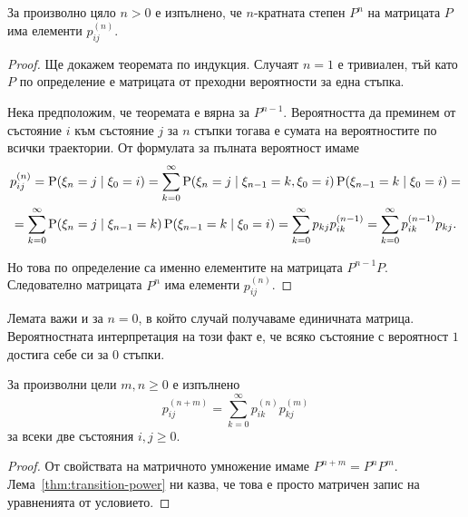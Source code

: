 \documentclass[numbers=endperiod, DIV=15, bibliography=totocnumbered]{scrartcl}
\begin{document}
\begin{lemma}\label{thm:transition-power}
  За произволно цяло $n > 0$ е изпълнено, че $n$-кратната степен $P^n$ на матрицата $P$ има елементи $p_{ij}^{(n)}$.
\end{lemma}
\begin{proof}
  Ще докажем теоремата по индукция. Случаят $n = 1$ е тривиален, тъй като $P$ по определение е матрицата от преходни вероятности за една стъпка.

  Нека предположим, че теоремата е вярна за $P^{n-1}$. Вероятността да преминем от състояние $i$ към състояние $j$ за $n$ стъпки тогава е сумата на вероятностите по всички траектории. От формулата за пълната вероятност имаме
  \begin{multline*}
    p^{(n)}_{ij}
    =
    \operatorname{P}(\xi_n = j \mid \xi_0 = i)
    =
    \sum_{k=0}^\infty \operatorname{P}(\xi_n = j \mid \xi_{n-1} = k, \xi_0 = i) \operatorname{P}(\xi_{n-1} = k \mid \xi_0 = i)
    = \\ =
    \sum_{k=0}^\infty \operatorname{P}(\xi_n = j \mid \xi_{n-1} = k) \operatorname{P}(\xi_{n-1} = k \mid \xi_0 = i)
    =
    \sum_{k=0}^\infty p_{kj} p^{(n-1)}_{ik}
    =
    \sum_{k=0}^\infty p^{(n-1)}_{ik} p_{kj}.
  \end{multline*}

  Но това по определение са именно елементите на матрицата $P^{n-1} P$. Следователно матрицата $P^n$ има елементи $p^{(n)}_{ij}$.
\end{proof}

\begin{note}
  Лемата важи и за $n = 0$, в който случай получаваме единичната матрица. Вероятностната интерпретация на този факт е, че всяко състояние с вероятност $1$ достига себе си за $0$ стъпки.
\end{note}

\begin{theorem}\label{thm:chapman-kolmogorov}
  За произволни цели $m, n \geq 0$ е изпълнено
  \begin{displaymath}
    p^{(n+m)}_{ij} = \sum_{k=0}^\infty p^{(n)}_{ik} p^{(m)}_{kj}
  \end{displaymath}
  за всеки две състояния $i, j \geq 0$.
\end{theorem}
\begin{proof}
  От свойствата на матричното умножение имаме $P^{n+m} = P^n P^m$. Лема~\ref{thm:transition-power} ни казва, че това е просто матричен запис на уравненията от условието.
\end{proof}
\end{document}
